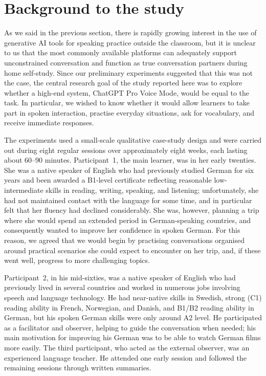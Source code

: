 \documentclass[11pt,a4paper]{article}
\begin{document}
\section{Background to the study}

As we said in the previous section, there is rapidly growing interest in the use of generative AI tools for speaking practice outside the classroom, but it is unclear to us that the most commonly available platforms can adequately support unconstrained conversation and function as true conversation partners during home self-study. Since our preliminary experiments suggested that this was not the case, the central research goal of the study reported here was to explore whether a high-end system, ChatGPT Pro Voice Mode, would be equal to the task. In particular, we wished to know whether it would allow learners to take part in spoken interaction, practise everyday situations, ask for vocabulary, and receive immediate responses.

The experiments used a small-scale qualitative case-study design and were carried out during eight regular sessions over approximately eight weeks, each lasting about 60--90 minutes. Participant~1, the main learner, was in her early twenties. She was a native speaker of English who had previously studied German for six years and been awarded a B1-level certificate reflecting reasonable low-intermediate skills in reading, writing, speaking, and listening; unfortunately, she had not maintained contact with the language for some time, and in particular felt that her fluency had declined considerably. She was, however, planning a trip where she would spend an extended period in German-speaking countries, and consequently wanted to improve her confidence in spoken German. For this reason, we agreed that we would begin by practising conversations organised around practical scenarios she could expect to encounter on her trip, and, if these went well, progress to more challenging topics.

Participant~2, in his mid-sixties, was a native speaker of English who had previously lived in several countries and worked in numerous jobs involving speech and language technology. He had near-native skills in Swedish, strong (C1) reading ability in French, Norwegian, and Danish, and B1/B2 reading ability in German, but his spoken German skills were only around A2 level. He participated as a facilitator and observer, helping to guide the conversation when needed; his main motivation for improving his German was to be able to watch German films more easily. The third participant, who acted as the external observer, was an experienced language teacher. He attended one early session and followed the remaining sessions through written summaries.
\end{document}
